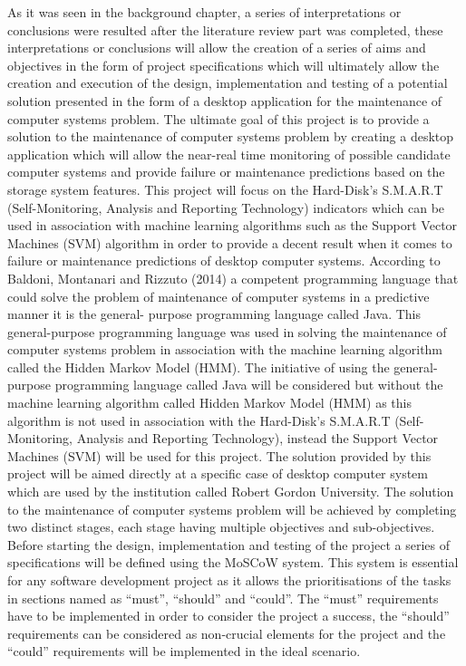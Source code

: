 As it was seen in the background chapter, a series of interpretations or conclusions were resulted after the
literature review part was completed, these interpretations or conclusions will allow the creation of a
series of aims and objectives in the form of project specifications which will ultimately allow the creation
and execution of the design, implementation and testing of a potential solution presented in the form of
a desktop application for the maintenance of computer systems problem. The ultimate goal of this project
is to provide a solution to the maintenance of computer systems problem by creating a desktop application
which will allow the near-real time monitoring of possible candidate computer systems and provide failure
or maintenance predictions based on the storage system features. This project will focus on the Hard-Disk’s
S.M.A.R.T (Self-Monitoring, Analysis and Reporting Technology) indicators which can be used in association
with machine learning algorithms such as the Support Vector Machines (SVM) algorithm in order to provide a
decent result when it comes to failure or maintenance predictions of desktop computer systems. According
to Baldoni, Montanari and Rizzuto (2014) a competent programming language that could solve the problem of
maintenance of computer systems in a predictive manner it is the general- purpose programming language
called Java. This general-purpose programming language was used in solving the maintenance of computer
systems problem in association with the machine learning algorithm called the Hidden Markov Model (HMM).
The initiative of using the general-purpose programming language called Java will be considered but without
the machine learning algorithm called Hidden Markov Model (HMM) as this algorithm is not used in association
with the Hard-Disk’s S.M.A.R.T (Self-Monitoring, Analysis and Reporting Technology), instead the Support
Vector Machines (SVM) will be used for this project. The solution provided by this project will be aimed
directly at a specific case of desktop computer system which are used by the institution called Robert
Gordon University. The solution to the maintenance of computer systems problem will be achieved by
completing two distinct stages, each stage having multiple objectives and sub-objectives.
Before starting the design, implementation and testing of the project a series of specifications
will be defined using the MoSCoW system. This system is essential for any software development
project as it allows the prioritisations of the tasks in sections named as “must”, “should” and
“could”. The “must” requirements have to be implemented in order to consider the project a success,
the “should” requirements can be considered as non-crucial elements for the project and the “could”
requirements will be implemented in the ideal scenario.

